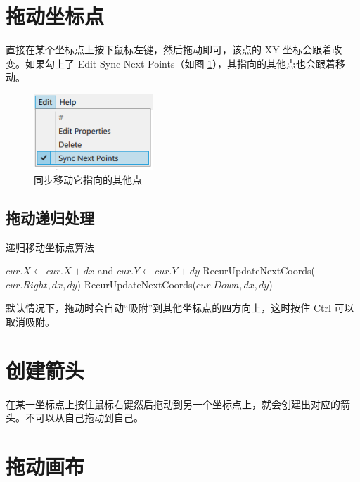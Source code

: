 \section{拖动坐标点}

直接在某个坐标点上按下鼠标左键，然后拖动即可，该点的 XY 坐标会跟着改变。如果勾上了 Edit-Sync Next Points（如图 \ref{fig:sync}），其指向的其他点也会跟着移动。

\begin{figure}[H]
  \centering
  \includegraphics[width=0.4\textwidth]{assets/sync.png}
  \caption{同步移动它指向的其他点}
  \label{fig:sync}
\end{figure}

\subsection{拖动递归处理}

\begin{algorithm}[H]
  \caption{递归移动坐标点算法}
  \begin{algorithmic}[1]
    \State $cur.X \gets cur.X + dx$ and $cur.Y \gets cur.Y + dy$
      \State RecurUpdateNextCoords($cur.Right, dx, dy$)
    \EndIf
      \State RecurUpdateNextCoords($cur.Down, dx, dy$)
    \EndIf
    \EndProcedure
  \end{algorithmic}
\end{algorithm}

默认情况下，拖动时会自动``吸附''到其他坐标点的四方向上，这时按住 Ctrl 可以取消吸附。

\section{创建箭头}

在某一坐标点上按住鼠标右键然后拖动到另一个坐标点上，就会创建出对应的箭头。不可以从自己拖动到自己。

\section{拖动画布}

